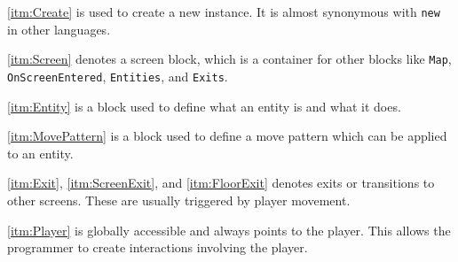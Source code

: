 \ref{itm:Create} is used to create a new instance. It is almost synonymous with \verb|new| in other languages.

\ref{itm:Screen} denotes a screen block, which is a container for other blocks like \verb|Map|, \verb|OnScreenEntered|, \verb|Entities|, and \verb|Exits|.

\ref{itm:Entity} is a block used to define what an entity is and what it does.

\ref{itm:MovePattern} is a block used to define a move pattern which can be applied to an entity.

\ref{itm:Exit}, \ref{itm:ScreenExit}, and \ref{itm:FloorExit} denotes exits or transitions to other screens. These are usually triggered by player movement.

\ref{itm:Player} is globally accessible and always points to the player. This allows the programmer to create interactions involving the player. 
    
